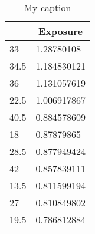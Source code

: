 \begin{table}[H]
	\centering
	\caption{My caption}
	\label{my-label}
	\begin{tabular}{|l|l|}
		\hline
		\rowcolor[HTML]{9B9B9B} 
		\multicolumn{1}{|c|}{\cellcolor[HTML]{9B9B9B}\textbf{Km}} & \multicolumn{1}{c|}{\cellcolor[HTML]{9B9B9B}\textbf{Exposure}} \\ \hline
		\rowcolor[HTML]{FE0000} 
		{\color[HTML]{333333} 33}                                 & {\color[HTML]{333333} 1.28780108}                              \\ \hline
		\rowcolor[HTML]{FE0000} 
		{\color[HTML]{333333} 34.5}                               & {\color[HTML]{333333} 1.184830121}                             \\ \hline
		\rowcolor[HTML]{FE0000} 
		{\color[HTML]{333333} 36}                                 & {\color[HTML]{333333} 1.131057619}                             \\ \hline
		\rowcolor[HTML]{F8FF00} 
		22.5                                                      & 1.006917867                                                    \\ \hline
		\rowcolor[HTML]{F8FF00} 
		40.5                                                      & 0.884578609                                                    \\ \hline
		\rowcolor[HTML]{F8FF00} 
		18                                                        & 0.87879865                                                     \\ \hline
		\rowcolor[HTML]{F8FF00} 
		28.5                                                      & 0.877949424                                                    \\ \hline
		\rowcolor[HTML]{F8FF00} 
		42                                                        & 0.857839111                                                    \\ \hline
		\rowcolor[HTML]{F8FF00} 
		13.5                                                      & 0.811599194                                                    \\ \hline
		\rowcolor[HTML]{F8FF00} 
		27                                                        & 0.810849802                                                    \\ \hline
		\rowcolor[HTML]{F8FF00} 
		19.5                                                      & 0.786812884                                                    \\ \hline

\end{tabular}
\end{table}
